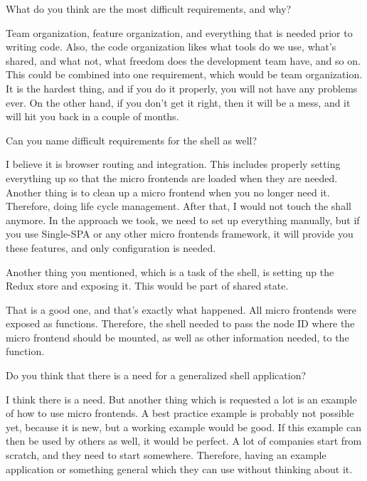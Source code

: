 \begin{description}
    \NicoVogel What do you think are the most difficult requirements, and why?


    \IvanJovanovic Team organization, feature organization, and everything that is needed prior to writing code. Also, the code organization likes what tools do we use, what's shared, and what not, what freedom does the development team have, and so on. This could be combined into one requirement, which would be team organization. It is the hardest thing, and if you do it properly, you will not have any problems ever. On the other hand, if you don't get it right, then it will be a mess, and it will hit you back in a couple of months.


    \NicoVogel Can you name difficult requirements for the shell as well?


    \IvanJovanovic I believe it is browser routing and integration. This includes properly setting everything up so that the micro frontends are loaded when they are needed. Another thing is to clean up a micro frontend when you no longer need it. Therefore, doing life cycle management. After that, I would not touch the shall anymore.
    In the approach we took, we need to set up everything manually, but if you use Single-SPA or any other micro frontends framework, it will provide you these features, and only configuration is needed.


    \NicoVogel Another thing you mentioned, which is a task of the shell, is setting up the Redux store and exposing it. This would be part of shared state.


    \IvanJovanovic That is a good one, and that's exactly what happened. All micro frontends were exposed as functions. Therefore, the shell needed to pass the node ID where the micro frontend should be mounted, as well as other information needed, to the function.


    \NicoVogel Do you think that there is a need for a generalized shell application?


    \IvanJovanovic I think there is a need. But another thing which is requested a lot is an example of how to use micro frontends. A best practice example is probably not possible yet, because it is new, but a working example would be good. If this example can then be used by others as well, it would be perfect. A lot of companies start from scratch, and they need to start somewhere. Therefore, having an example application or something general which they can use without thinking about it.


\end{description}